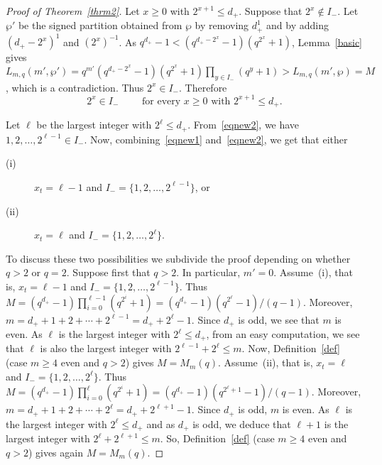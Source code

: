 \documentclass{amsart}
\begin{document}
\begin{proof}[Proof of Theorem~\ref{thrm2}]
Let $x\geq 0$ with $2^{x+1}\leq d_+$. Suppose that $2^x\notin I_-$.  Let $\wp'$ be the signed partition obtained from $\wp$ by removing $d_+^1$  and by adding $(d_+-2^x)^1$ and $(2^x)^{-1}$. As $q^{d_+}-1<(q^{d_+-2^x}-1)(q^{2^x}+1)$, Lemma~\ref{basic} gives $L_{m,q}(m',\wp')=q^{m'}(q^{d_+-2^x}-1)(q^{2^x}+1)\prod_{y\in I_-}(q^y+1)>L_{m,q}(m',\wp)=M$, which is a contradiction. Thus $2^{x}\in I_-$. Therefore
\begin{equation}\label{eqnew2}
2^x\in I_-\qquad\textrm{ for every }x\geq 0\textrm{ with }2^{x+1}\leq d_+.
\end{equation}

Let $\ell$ be the largest integer with $2^{\ell}\leq d_+$. From~\eqref{eqnew2}, we have $1,2,\ldots,2^{\ell-1}\in I_-$. Now, combining~\eqref{eqnew1} and~\eqref{eqnew2}, we get that  either
\begin{description}
\item[(i)]$x_t={\ell-1}$ and $I_-=\{1,2,\ldots,2^{\ell-1}\}$, or
\item[(ii)]$x_t=\ell$ and $I_-=\{1,2,\ldots,2^\ell\}$.
\end{description}

To discuss these two possibilities we subdivide the proof depending on whether $q>2$ or $q=2$. Suppose first that $q>2$. In particular, $m'=0$. Assume~(i), that is, $x_t={\ell-1}$ and $I_-=\{1,2,\ldots,2^{\ell-1}\}$. Thus $M=(q^{d_+}-1)\prod_{i=0}^{\ell-1}(q^{2^i}+1)=(q^{d_+}-1)(q^{2^\ell}-1)/(q-1)$. Moreover, $m=d_++1+2+\cdots +2^{\ell-1}=d_++2^{\ell}-1$. Since $d_+$ is odd, we see that $m$ is even. As $\ell$ is the largest integer with $2^\ell\leq d_+$, from an easy computation, we see that  $\ell$ is also the largest integer with  $2^{\ell-1}+2^{\ell}\leq m$. Now, Definition~\ref{def} (case $m\geq 4$ even and $q>2$) gives $M=M_m(q)$. Assume~(ii), that is, $x_t=\ell$ and $I_-=\{1,2,\ldots,2^\ell\}$. Thus $M=(q^{d_+}-1)\prod_{i=0}^{\ell}(q^{2^i}+1)=(q^{d_+}-1)(q^{2^\ell+1}-1)/(q-1)$. Moreover, $m=d_++1+2+\cdots +2^{\ell}=d_++2^{\ell+1}-1$. Since $d_+$ is odd, $m$ is even. As $\ell$ is the largest integer with $2^\ell\leq d_+$ and as $d_+$ is odd, we deduce that $\ell+1$ is the largest integer with  $2^{\ell}+2^{\ell+1}\leq m$. So, Definition~\ref{def} (case $m\geq 4$ even and $q>2$) gives again $M=M_m(q)$.


\end{proof}
\end{document}
